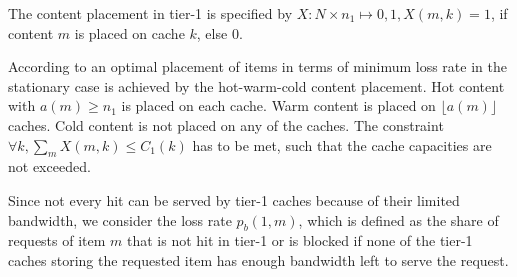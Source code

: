 The content placement in tier-1 is specified by $X: N \times n_1\mapsto {0,1}, X(m,k) = 1$, if content $m$ is placed on cache $k$, else $0$.

According to \cite{valancius2009greening} an optimal placement of items in terms of minimum loss rate in the stationary case is achieved by the hot-warm-cold content placement.
Hot content with $a(m)\geq n_1$ is placed on each cache.
Warm content is placed on $\lfloor a(m) \rfloor$ caches.
Cold content is not placed on any of the caches.
The constraint  $\forall k, \sum_m X(m,k)\leq C_1(k)$ has to be met, such that the cache capacities are not exceeded.

%




%

Since not every hit can be served by tier-1 caches because of their limited bandwidth, we consider the loss rate $p_{b}(1,m)$, which is defined as the share of requests of item $m$ that is not hit in tier-1 or is blocked if none of the tier-1 caches storing the requested item has enough bandwidth left to serve the request.

